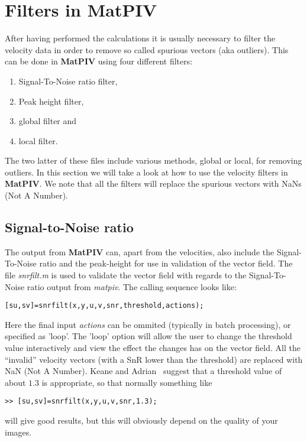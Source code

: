 \documentclass{book}
\begin{document}
\section{Filters in {\bf MatPIV}}

After having performed the calculations it is usually necessary to
filter the velocity data in order to remove so called spurious vectors
(aka outliers). This can be done in {\bf MatPIV} using four different
filters:
\begin{enumerate}
\item Signal-To-Noise ratio filter,
\item Peak height filter, 
\item global filter and
\item local filter.
\end{enumerate}
The two latter of these files include various methods, global or local,
for removing outliers. In this section we will take a look at how to use
the velocity filters in {\bf MatPIV}. We note that all the filters will
replace the spurious vectors with NaNs (Not A Number).

\subsection{Signal-to-Noise ratio}
The output from {\bf MatPIV} can, apart from the velocities, also
include the Signal-To-Noise ratio and the peak-height for use in
validation of the vector field. The file {\em snrfilt.m} is used to
validate the vector field with regards to the Signal-To-Noise ratio
output from {\em matpiv}. The calling sequence looks like:
\begin{verbatim}
[su,sv]=snrfilt(x,y,u,v,snr,threshold,actions);
\end{verbatim}

Here the final input {\em actions} can be ommited (typically in batch
processing), or specified as 'loop'. The 'loop' option will allow the
user to change the threshold value interactively and view the effect the
changes has on the vector field. All the ``invalid'' velocity vectors
(with a SnR lower than the threshold) are replaced with NaN (Not A
Number). Keane and Adrian~\cite{Keane:1992} suggest that a threshold
value of about $1.3$ is appropriate, so that normally something like
\begin{verbatim}
>> [su,sv]=snrfilt(x,y,u,v,snr,1.3);
\end{verbatim}
will give good results, but this will obviously depend on the quality of
your images.
\end{document}
